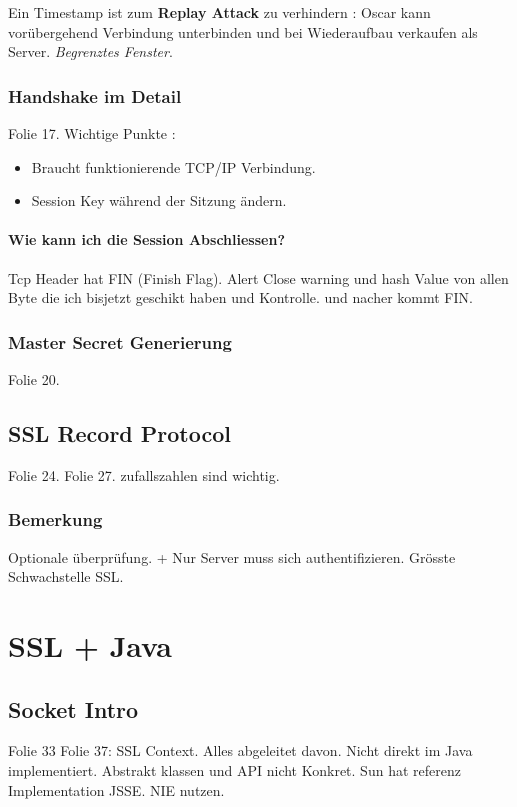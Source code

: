 \documentclass[a4paper,10pt]{scrreprt}
\begin{document}
Ein Timestamp ist zum \textbf{Replay Attack} zu verhindern : Oscar kann vorübergehend Verbindung unterbinden und bei 
Wiederaufbau verkaufen als Server.
\textit{Begrenztes Fenster}.

\subsection{Handshake im Detail}
Folie 17.
Wichtige Punkte :
\begin{itemize}
 \item Braucht funktionierende TCP/IP Verbindung.
 \item Session Key während der Sitzung ändern.
\end{itemize}

\subsubsection{Wie kann ich die Session Abschliessen?}
Tcp Header hat FIN (Finish Flag).
Alert Close warning und hash Value von allen Byte die ich bisjetzt geschikt haben und Kontrolle. und nacher kommt FIN.

\subsection{Master Secret Generierung}
Folie 20.

\section{SSL Record Protocol}
Folie 24.
Folie 27.
zufallszahlen sind wichtig.

\subsection{Bemerkung}
Optionale überprüfung. + Nur Server muss sich authentifizieren. Grösste Schwachstelle SSL.

\chapter{SSL + Java}
\section{Socket Intro}
Folie 33
Folie 37:
SSL Context. Alles abgeleitet davon. Nicht direkt im Java implementiert. Abstrakt klassen und API nicht Konkret. Sun hat 
referenz Implementation JSSE.
NIE nutzen. 
\end{document}
